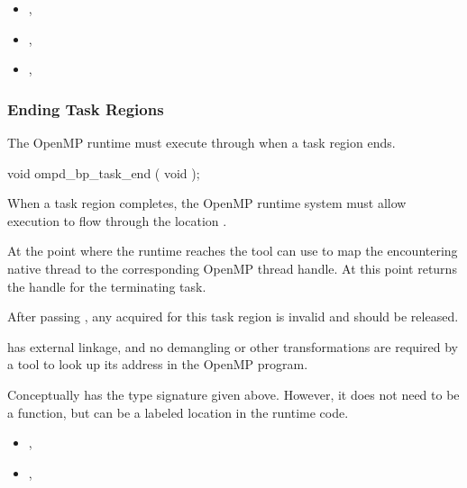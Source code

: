 \crossreferences
\begin{itemize}
\item
  , 
\item
  , 
\item
  , 
\end{itemize}

\subsubsection{Ending Task Regions}
\label{subsubsec:ompd_bp_task_end}

\summary
The OpenMP runtime must execute through 
when a task region ends.


\begin{cspecific}
\begin{ompSyntax}
void ompd_bp_task_end ( void );
\end{ompSyntax}
\end{cspecific}


\descr

When a task region completes, the OpenMP runtime system
must allow execution to flow through the location .

At the point where the runtime reaches 
the tool can use
to map the encountering native thread to the corresponding
OpenMP thread handle.
At this point 
returns the handle for the terminating task.

After passing , any  acquired for this
task region is invalid and should be released.

\restrictions

 has external  linkage, and no
demangling or other transformations are required by a tool
to look up its address in the OpenMP program.

Conceptually  has the type signature
given above.
However, it does not need to be a function, but can be a labeled location
in the runtime code.

\crossreferences
\begin{itemize}
\item
  , 
\item
  , 
\end{itemize}

